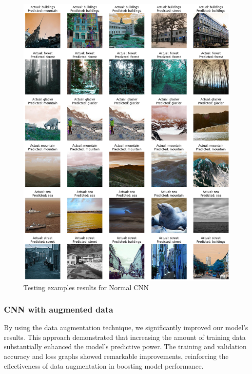 \documentclass[conference]{IEEEtran}
\begin{document}
\begin{figure}[H]
    \centering
    \includegraphics[width=1\linewidth]{images//CNN/ExamplesCNNNormal.png}
    \caption{Testing examples results for Normal CNN}
    \label{fig:examples_CNN_Normal}
\end{figure}


\subsubsection{CNN with augmented data}

By using the data augmentation technique, we significantly improved our model's results. This approach demonstrated that increasing the amount of training data substantially enhanced the model's predictive power. The training and validation accuracy and loss graphs showed remarkable improvements, reinforcing the effectiveness of data augmentation in boosting model performance.
\end{document}
